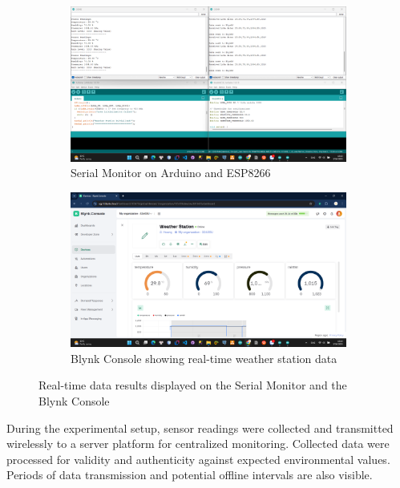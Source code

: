 \documentclass[conference, onecolumn]{IEEEtran}
\begin{document}
\begin{figure}[H]
    \centering
    \begin{subfigure}{0.45\textwidth}
        \centering
        \includegraphics[width=0.9\linewidth]{figures/Screenshot (197).png}
        \caption{Serial Monitor on Arduino and ESP8266} 
        \label{fig:serial_monitor}
    \end{subfigure}
    \hfill
    \begin{subfigure}{0.45\textwidth}
        \centering
        \includegraphics[width=0.9\linewidth]{figures/Screenshot (199).png}
        \caption{Blynk Console showing real-time weather station data}
        \label{fig:blynk_console}
    \end{subfigure}
    \caption{Real-time data results displayed on the Serial Monitor and the Blynk Console}
    \label{fig:data_results}
\end{figure}

During the experimental setup, sensor readings were collected and transmitted wirelessly to a server platform for centralized monitoring. Collected data were processed for validity and authenticity against expected environmental values. Periods of data transmission and potential offline intervals are also visible.
\end{document}
